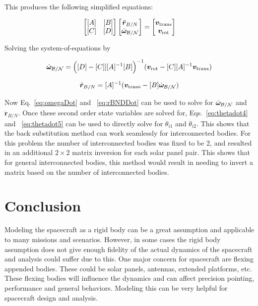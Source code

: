 \documentclass[paper]{aiaaNew}
\begin{document}
This produces the following simplified equations:

	\begin{equation}
\begin{bmatrix}
[A] & [B]\\
[C] & [D]
\end{bmatrix} \begin{bmatrix}
\ddot{\bm r}_{B/N}\\
\dot{\bm\omega}_{\cal B/N}
\end{bmatrix} = \begin{bmatrix}
\bm v_{\text{trans}}\\
\bm v_{\text{rot}}
\end{bmatrix}
\end{equation}

Solving the system-of-equations by

\begin{equation}
\dot{\bm\omega}_{\cal B/N} = \Big([D] - [C]][A]^{-1}[B]\Big)^{-1}(\bm v_{\text{rot}} - [C][A]^{-1}\bm v_{\text{trans}})
\label{eq:omegaDot}
\end{equation}

\begin{equation}
\ddot{\bm r}_{B/N} = [A]^{-1} (\bm v_{\text{trans}} - [B]\dot{\bm\omega}_{\cal B/N})
\label{eq:rBNDDot}
\end{equation}
	
	Now Eq.~\eqref{eq:omegaDot} and ~\eqref{eq:rBNDDot} can be used to solve for $\dot{\bm\omega}_{\cal B/N}$ and $\ddot{\bm r}_{B/N}$. Once these second order state variables are solved for, Eqs.~\eqref{eq:thetadot4} and ~\eqref{eq:thetadot5} can be used to directly solve for $\ddot \theta_{i1}$ and $\ddot \theta_{i2}$. This shows that the back substitution method can work seamlessly for interconnected bodies. For this problem the number of interconnected bodies was fixed to be 2, and resulted in an additional $2\times 2$ matrix inversion for each solar panel pair. This shows that for general interconnected bodies, this method would result in needing to invert a matrix based on the number of interconnected bodies. 
		
	\section{Conclusion}
	
	Modeling the spacecraft as a rigid body can be a great assumption and applicable to many missions and scenarios. However, in some cases the rigid body assumption does not give enough fidelity of the actual dynamics of the spacecraft and analysis could suffer due to this. One major concern for spacecraft are flexing appended bodies. These could be solar panels, antennas, extended platforms, etc. These flexing bodies will influence the dynamics and can affect precision pointing, performance and general behaviors. Modeling this can be very helpful for spacecraft design and analysis. 
	
\end{document}
